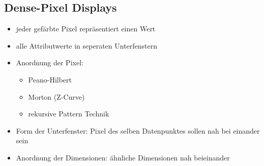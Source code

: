 \subsection{Dense-Pixel Displays}
\begin{itemize}
	\item jeder gefärbte Pixel repräsentiert einen Wert
	\item alle Attributwerte in seperaten Unterfenstern
	\item Anordnung der Pixel:
		\begin{itemize}
			\item Peano-Hilbert
			\item Morton (Z-Curve)
			\item rekursive Pattern Technik
		\end{itemize}
	\item Form der Unterfenster: Pixel des selben Datenpunktes sollen nah bei einander sein
	\item Anordnung der Dimensionen: ähnliche Dimensionen nah beieinander
\end{itemize}
\topbreak
\vspace*{-1.5\baselineskip}
